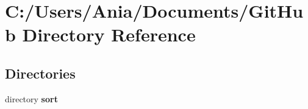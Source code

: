\section{C\-:/\-Users/\-Ania/\-Documents/\-Git\-Hub Directory Reference}
\label{dir_e5fbe6d2783ccd4c93c7856d92d7be6e}
\subsection*{Directories}
\begin{DoxyCompactItemize}
\item 
directory {\bf sort}
\end{DoxyCompactItemize}
